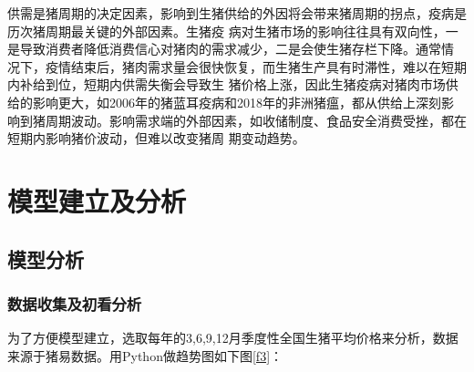 \documentclass[a4paper,AutoFakeBold,AutoFakeSlant]{ctexart}
\begin{document}
\begin{table}[H]
\begin{center}
\label{}
\caption{历次猪周期下行期}
\end{center}
\end{table}

供需是猪周期的决定因素，影响到生猪供给的外因将会带来猪周期的拐点，疫病是历次猪周期最关键的外部因素。生猪疫
病对生猪市场的影响往往具有双向性，一是导致消费者降低消费信心对猪肉的需求减少，二是会使生猪存栏下降。通常情
况下，疫情结束后，猪肉需求量会很快恢复，而生猪生产具有时滞性，难以在短期内补给到位，短期内供需失衡会导致生
猪价格上涨，因此生猪疫病对猪肉市场供给的影响更大，如2006年的猪蓝耳疫病和2018年的非洲猪瘟，都从供给上深刻影
响到猪周期波动。影响需求端的外部因素，如收储制度、食品安全消费受挫，都在短期内影响猪价波动，但难以改变猪周
期变动趋势。





\section{模型建立及分析}

\subsection{模型分析}

\subsubsection{数据收集及初看分析}
为了方便模型建立，选取每年的3,6,9,12月季度性全国生猪平均价格来分析，数据来源于猪易数据\cite{猪易数据}。用Python做趋势图如下图\ref{f3}：
\end{document}
